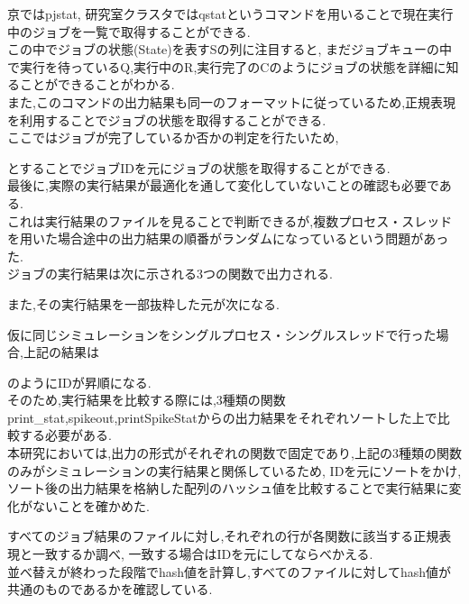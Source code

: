 京ではpjstat, 研究室クラスタではqstatというコマンドを用いることで現在実行中のジョブを一覧で取得することができる.\\
この中でジョブの状態(State)を表すSの列に注目すると, まだジョブキューの中で実行を待っているQ,実行中のR,実行完了のCのようにジョブの状態を詳細に知ることができることがわかる.\\
また,このコマンドの出力結果も同一のフォーマットに従っているため,正規表現を利用することでジョブの状態を取得することができる.\\
ここではジョブが完了しているか否かの判定を行たいため,
{\footnotesize

}
とすることでジョブIDを元にジョブの状態を取得することができる.\\

最後に,実際の実行結果が最適化を通して変化していないことの確認も必要である.\\
これは実行結果のファイルを見ることで判断できるが,複数プロセス・スレッドを用いた場合途中の出力結果の順番がランダムになっているという問題があった.\\
ジョブの実行結果は次に示される3つの関数で出力される.\\
{\footnotesize

}
また,その実行結果を一部抜粋した元が次になる.\\
{\footnotesize

}
仮に同じシミュレーションをシングルプロセス・シングルスレッドで行った場合,上記の結果は
{\footnotesize

}
のようにIDが昇順になる.\\
そのため,実行結果を比較する際には,3種類の関数print\_stat,spikeout,printSpikeStatからの出力結果をそれぞれソートした上で比較する必要がある.\\
本研究においては,出力の形式がそれぞれの関数で固定であり,上記の3種類の関数のみがシミュレーションの実行結果と関係しているため,
IDを元にソートをかけ,ソート後の出力結果を格納した配列のハッシュ値を比較することで実行結果に変化がないことを確かめた.\\
{\footnotesize

}
すべてのジョブ結果のファイルに対し,それぞれの行が各関数に該当する正規表現と一致するか調べ,
一致する場合はIDを元にしてならべかえる.\\
並べ替えが終わった段階でhash値を計算し,すべてのファイルに対してhash値が共通のものであるかを確認している.\\
